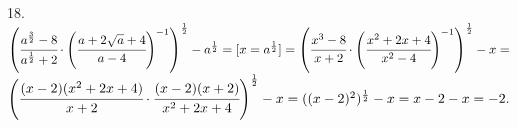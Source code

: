 18. $\left(\cfrac{a^\frac{3}{2}-8}{a^\frac{1}{2}+2}\cdot\left(\cfrac{a+2\sqrt{a}+4}{a-4}\right)^{-1}\right)^\frac{1}{2}-a^\frac{1}{2}=[x=a^\frac{1}{2}]=
\left(\cfrac{x^3-8}{x+2}\cdot\left(\cfrac{x^2+2x+4}{x^2-4}\right)^{-1}\right)^\frac{1}{2}-x=$\\$
\left(\cfrac{(x-2)(x^2+2x+4)}{x+2}\cdot\cfrac{(x-2)(x+2)}{x^2+2x+4}\right)^\frac{1}{2}-x=((x-2)^2)^\frac{1}{2}-x=x-2-x=-2.$\\
